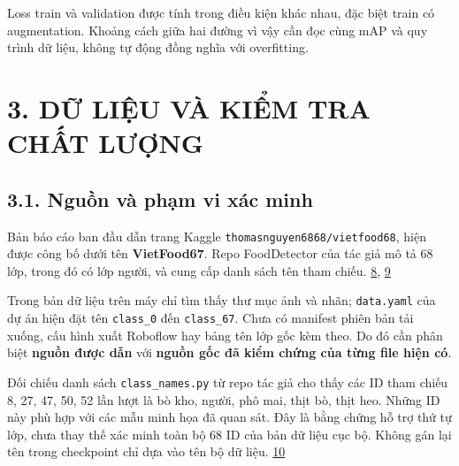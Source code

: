 \documentclass[
  vietnamese,
  12pt,
  a4paper,
]{article}
\begin{document}
Loss train và validation được tính trong điều kiện khác nhau, đặc biệt
train có augmentation. Khoảng cách giữa hai đường vì vậy cần đọc cùng
mAP và quy trình dữ liệu, không tự động đồng nghĩa với overfitting.

\section{3. DỮ LIỆU VÀ KIỂM TRA CHẤT
LƯỢNG}\label{dux1eef-liux1ec7u-vuxe0-kiux1ec3m-tra-chux1ea5t-lux1b0ux1ee3ng}

\subsection{3.1. Nguồn và phạm vi xác
minh}\label{nguux1ed3n-vuxe0-phux1ea1m-vi-xuxe1c-minh}

Bản báo cáo ban đầu dẫn trang Kaggle
\texttt{t\allowbreak{}h\allowbreak{}o\allowbreak{}m\allowbreak{}a\allowbreak{}s\allowbreak{}n\allowbreak{}g\allowbreak{}u\allowbreak{}y\allowbreak{}e\allowbreak{}n\allowbreak{}6\allowbreak{}8\allowbreak{}6\allowbreak{}8\allowbreak{}/\allowbreak{}v\allowbreak{}i\allowbreak{}e\allowbreak{}t\allowbreak{}f\allowbreak{}o\allowbreak{}o\allowbreak{}d\allowbreak{}6\allowbreak{}8\allowbreak{}},
hiện được công bố dưới tên \textbf{VietFood67}. Repo FoodDetector của
tác giả mô tả 68 lớp, trong đó có lớp người, và cung cấp danh sách tên
tham chiếu.
\href{https://www.kaggle.com/datasets/thomasnguyen6868/vietfood68}{8},
\href{https://github.com/nvhnam/FoodDetector}{9}

Trong bản dữ liệu trên máy chỉ tìm thấy thư mục ảnh và nhãn;
\texttt{d\allowbreak{}a\allowbreak{}t\allowbreak{}a\allowbreak{}.\allowbreak{}y\allowbreak{}a\allowbreak{}m\allowbreak{}l\allowbreak{}}
của dự án hiện đặt tên
\texttt{c\allowbreak{}l\allowbreak{}a\allowbreak{}s\allowbreak{}s\allowbreak{}\_\allowbreak{}0\allowbreak{}}
đến
\texttt{c\allowbreak{}l\allowbreak{}a\allowbreak{}s\allowbreak{}s\allowbreak{}\_\allowbreak{}6\allowbreak{}7\allowbreak{}}.
Chưa có manifest phiên bản tải xuống, cấu hình xuất Roboflow hay bảng
tên lớp gốc kèm theo. Do đó cần phân biệt \textbf{nguồn được dẫn} với
\textbf{nguồn gốc đã kiểm chứng của từng file hiện có}.

Đối chiếu danh sách
\texttt{c\allowbreak{}l\allowbreak{}a\allowbreak{}s\allowbreak{}s\allowbreak{}\_\allowbreak{}n\allowbreak{}a\allowbreak{}m\allowbreak{}e\allowbreak{}s\allowbreak{}.\allowbreak{}p\allowbreak{}y\allowbreak{}}
từ repo tác giả cho thấy các ID tham chiếu 8, 27, 47, 50, 52 lần lượt là
bò kho, người, phô mai, thịt bò, thịt heo. Những ID này phù hợp với các
mẫu minh họa đã quan sát. Đây là bằng chứng hỗ trợ thứ tự lớp, chưa thay
thế xác minh toàn bộ 68 ID của bản dữ liệu cục bộ. Không gán lại tên
trong checkpoint chỉ dựa vào tên bộ dữ liệu.
\href{https://raw.githubusercontent.com/nvhnam/FoodDetector/v2/class_names.py}{10}
\end{document}
